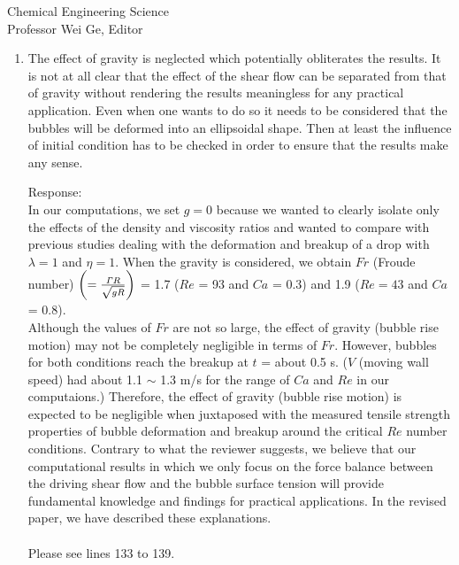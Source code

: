 \documentclass{letter}
\begin{document}
\begin{letter}{
Chemical Engineering Science\\
Professor Wei Ge, Editor\\}
\begin{enumerate}
Since it takes a very long computational time to obtain results for the effect of $\lambda$ and $\eta$ on drop deformation and breakup, 
all computations for these conditions have not been finished. We will also present the fruits of research on the effect of density and 
viscosity ratios in the next papers. \\
\\

\par\noindent
\item
\textsf
{The effect of gravity is neglected which potentially obliterates the results. It is not at all clear that the effect of the shear flow can be separated from that of gravity without rendering the results meaningless for any practical application. Even when one wants to do so it needs to be considered that the bubbles will be deformed into an ellipsoidal shape. Then at least the influence of initial condition has to be checked in order to ensure that the results make any sense. \\}
\vspace{3 mm}

Response: \\
In our computations, we set $g = 0$ because we wanted to clearly isolate only the effects of the density and viscosity ratios and 
wanted to compare with previous studies dealing with the deformation and breakup of a drop with $\lambda =1$ and $\eta = 1$.
When the gravity is considered, we obtain $Fr$ (Froude number) $\left(= \frac{{\it \Gamma}R}{\sqrt {gR}} \right)$ = 1.7 ($Re$ = 93 and $Ca$ = 0.3) 
and 1.9 ($Re = 43$ and $Ca$ = 0.8). \\
Although the values of $Fr$ are not so large, the effect of gravity (bubble rise motion) may not be completely negligible in terms of $Fr$.
However, bubbles for both conditions reach the breakup at $t$ = about 0.5 s. 
($V$ (moving wall speed) had about 1.1 $\sim$ 1.3 m/s for the range of $Ca$ and $Re$ in our computaions.)
Therefore, the effect of gravity (bubble rise motion) is expected to be negligible when juxtaposed with the measured tensile strength properties of bubble deformation and breakup 
around the critical $Re$ number conditions. Contrary to what the reviewer suggests, we believe that our computational results in which we only focus on the force balance between the driving shear flow and the bubble surface tension will provide fundamental knowledge and findings for practical applications.  In the revised paper, we have described these explanations.\\
\\
Please see lines 133 to 139.
\\


\end{enumerate}
\end{letter}
\end{document}
